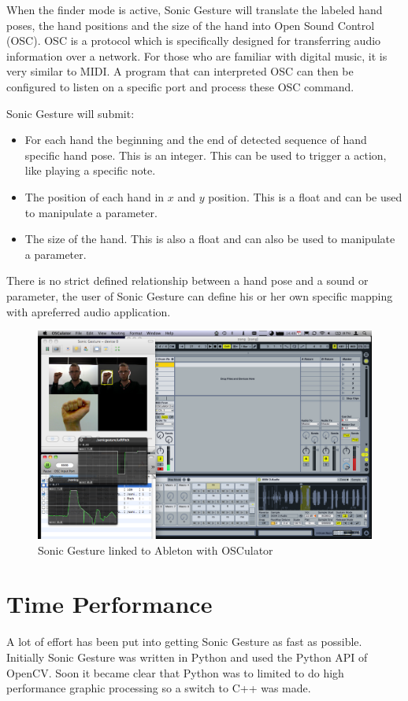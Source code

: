 When the finder mode is active, Sonic Gesture will translate the labeled hand poses, the hand positions and the size of the hand into Open Sound Control (OSC). OSC is a protocol which is specifically designed for transferring audio information over a network. For those who are familiar with digital music, it is very similar to MIDI. A program that can interpreted OSC can then be configured to listen on a specific port and process these OSC command.

Sonic Gesture will submit:
\begin{itemize}
	\item For each hand the beginning and the end of detected sequence of hand specific hand pose. This is an integer. This can be used to trigger a action, like playing a specific note.
	\item The position of each hand in $x$ and $y$ position. This is a float and can be used to manipulate a parameter.
	\item The size of the hand. This is also a float and can also be used to manipulate a parameter.
\end{itemize}

There is no strict defined relationship between a hand pose and a sound or parameter, the user of Sonic Gesture can define his or her own specific mapping with apreferred audio application. 

\begin{figure}[ht]
\centering{}
\includegraphics[width=0.9\linewidth]{figures/sonicableton.png}
\caption{Sonic Gesture linked to Ableton with OSCulator}
\label{fig:sonicableton}
\end{figure}

\section{Time Performance}
A lot of effort has been put into getting Sonic Gesture as fast as possible. Initially Sonic Gesture was written in Python and used the Python API of OpenCV. Soon it became clear that Python was to limited to do high performance graphic processing so a switch to C++ was made. 

